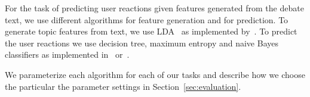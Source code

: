 
For the task of predicting user reactions given features generated from the debate text, we use different algorithms for feature generation and for prediction.  To generate topic features from text, we use LDA~\cite{blei_latent_2003} as implemented by~\cite{mccallum_mallet:_2002}.  To predict the user reactions we use decision tree, maximum entropy and naive Bayes classifiers as implemented in~\cite{mccallum_mallet:_2002} or~\cite{bird_nltk:_2006}.

We parameterize each algorithm for each of our tasks and describe how we choose the particular the parameter settings in Section~\ref{sec:evaluation}.